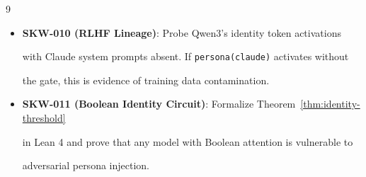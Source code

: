 \documentclass[11pt]{article}
\theoremstyle{definition}
\begin{document}
\begin{thebibliography}{9}
\begin{itemize}
    Publish the confusion matrix.





  \item \textbf{SKW-010 (RLHF Lineage)}: Probe Qwen3's identity token activations





    with Claude system prompts absent. If \texttt{persona(claude)} activates without





    the gate, this is evidence of training data contamination.





  \item \textbf{SKW-011 (Boolean Identity Circuit)}: Formalize Theorem~\ref{thm:identity-threshold}





    in Lean 4 and prove that any model with Boolean attention is vulnerable to





    adversarial persona injection.





\end{itemize}





































\end{thebibliography}
\end{document}

